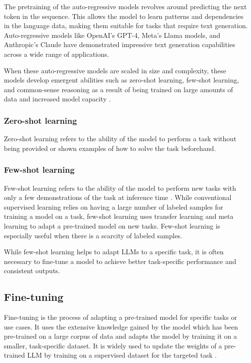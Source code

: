The pretraining of the auto-regressive models revolves around predicting the next token in the sequence. This allows the model to learn patterns and dependencies in the language data, making them suitable for tasks that require text generation. Auto-regressive models like OpenAI’s GPT-4, Meta’s Llama models, and Anthropic’s Claude have demonstrated impressive text generation capabilities across a wide range of applications. 

When these auto-regressive models are scaled in size and complexity, these models develop emergent abilities such as zero-shot learning, few-shot learning, and common-sense reasoning as a result of being trained on large amounts of data and increased model capacity \cite{wei2022emergent}. 

\subsubsection{Zero-shot learning} \label{ZeroShot}
Zero-shot learning refers to the ability of the model to perform a task without being provided or shown examples of how to solve the task beforehand.

\subsubsection{Few-shot learning} \label{FewShot}
Few-shot learning refers to the ability of the model to perform new tasks with only a few demonstrations of the task at inference time \cite{brown2020language}. While conventional supervised learning relies on having a large number of labeled samples for training a model on a task, few-shot learning uses transfer learning and meta learning to adapt a pre-trained model on new tasks. Few-shot learning is especially useful when there is a scarcity of labeled samples.

While few-shot learning helps to adapt LLMs to a specific task, it is often necessary to fine-tune a model to achieve better task-specific performance and consistent outputs.


\subsection{Fine-tuning}
Fine-tuning is the process of adapting a pre-trained model for specific tasks or use cases. It uses the extensive knowledge gained by the model which has been pre-trained on a large corpus of data and adapts the model by training it on a smaller, task-specific dataset. It is widely used to update the weights of a pre-trained LLM by training on a supervised dataset for the targeted task \cite{brown2020language}. 

